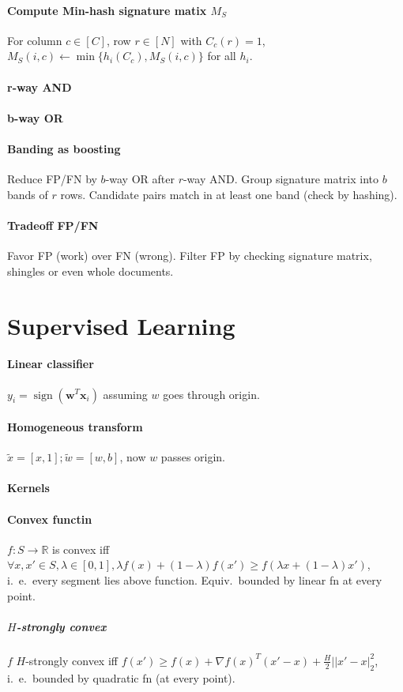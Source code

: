 \documentclass[a4paper, 9pt, DIV=24]{scrartcl}
\DeclareMathOperator{\sign}{sign}
\newcommand{\R}{\mathbb{R}}
\begin{document}
\begin{twocolumn}
\paragraph{Compute Min-hash signature matix $M_S$}
For column $c \in [C]$, row $r \in [N]$ with $C_c(r) = 1$, $M_S(i,c) \leftarrow \min\{h_i(C_c), M_S(i,c)\}$ for all $h_i$.

\paragraph{r-way AND}
\paragraph{b-way OR}

\paragraph{Banding as boosting}
Reduce FP/FN by $b$-way OR after $r$-way AND.
Group signature matrix into $b$ bands of $r$ rows.
Candidate pairs match in at least one band (check by hashing).

\paragraph{Tradeoff FP/FN}
Favor FP (work) over FN (wrong).
Filter FP by checking signature matrix, shingles or even whole documents.


\section{Supervised Learning}
\paragraph{Linear classifier} $y_i = \sign(\bm w^T\bm x_i)$ assuming $w$ goes through origin.
\paragraph{Homogeneous transform} $\tilde x = [x, 1]; \tilde w = [w, b]$, now $w$ passes origin.
\paragraph{Kernels}
\paragraph{Convex functin} $f: S \rightarrow \R$ is convex iff $\forall x,x'\in S, \lambda \in [0,1], \lambda f(x) + (1-\lambda)f(x') \geq f(\lambda x + (1-\lambda)x')$, i.\ e.\ every segment lies above function. Equiv.\ bounded by linear fn at every point.
\subparagraph{$H$-strongly convex} $f$ $H$-strongly convex iff $f(x') \geq f(x) + \nabla f(x)^T(x'-x)+\frac{H}{2}||x'-x|_2^2$, i.\ e.\ bounded by quadratic fn (at every point).

\end{twocolumn}
\end{document}
